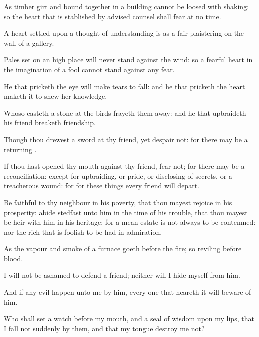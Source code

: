 {\par }{\PP {}As timber girt and bound together in a building cannot be loosed with shaking: so the heart that is stablished by advised counsel shall fear at no time.
\par }{\PP {}A heart settled upon a thought of understanding is as a fair plaistering on the wall of a gallery.
\par }{\PP {}Pales set on an high place will never stand against the wind: so a fearful heart in the imagination of a fool cannot stand against any fear.
\par }{\PP {}He that pricketh the eye will make tears to fall: and he that pricketh the heart maketh it to shew her knowledge.
\par }{\PP {}Whoso casteth a stone at the birds frayeth them away: and he that upbraideth his friend breaketh friendship.
\par }{\PP {}Though thou drewest a sword at thy friend, yet despair not: for there may be a returning
{}.
\par }{\PP {}If thou hast opened thy mouth against thy friend, fear not; for there may be a reconciliation: except for upbraiding, or pride, or disclosing of secrets, or a treacherous wound: for for these things every friend will depart.
\par }{\PP {}Be faithful to thy neighbour in his poverty, that thou mayest rejoice in his prosperity: abide stedfast unto him in the time of his trouble, that thou mayest be heir with him in his heritage: for a mean estate is not always to be contemned: nor the rich that is foolish to be had in admiration.
\par }{\PP {}As the vapour and smoke of a furnace goeth before the fire; so reviling before blood.
\par }{\PP {}I will not be ashamed to defend a friend; neither will I hide myself from him.
\par }{\PP {}And if any evil happen unto me by him, every one that heareth it will beware of him.
\par }{\PP {}Who shall set a watch before my mouth, and a seal of wisdom upon my lips, that I fall not suddenly by them, and that my tongue destroy me not?

}
